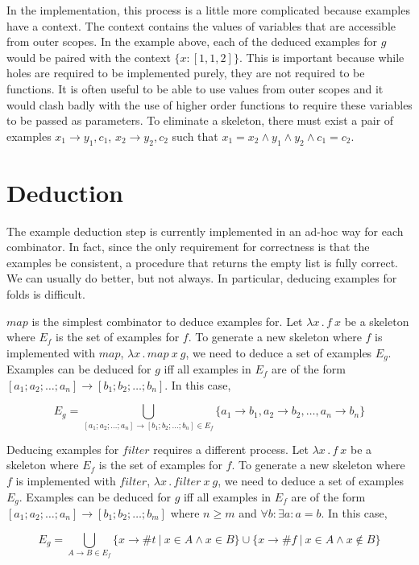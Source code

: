 \documentclass[11pt]{article}
\begin{document}
In the implementation, this process is a little more complicated
because examples have a context. The context contains the values of
variables that are accessible from outer scopes. In the example above,
each of the deduced examples for $g$ would be paired with the context
$\{x:[1,1,2]\}$. This is important because while holes are required to
be implemented purely, they are not required to be functions. It is
often useful to be able to use values from outer scopes and it would
clash badly with the use of higher order functions to require these
variables to be passed as parameters. To eliminate a skeleton, there
must exist a pair of examples $x_1 \rightarrow y_1, c_1$, $x_2
\rightarrow y_2, c_2$ such that $x_1 = x_2 \land y_1 \land y_2 \land
c_1 = c_2$.

\section{Deduction}
\label{sec-3}
The example deduction step is currently implemented in an ad-hoc way
for each combinator. In fact, since the only requirement for
correctness is that the examples be consistent, a procedure that
returns the empty list is fully correct. We can usually do better, but
not always. In particular, deducing examples for folds is difficult.

$map$ is the simplest combinator to deduce examples for. Let $\lambda
x\,.\,f~x$ be a skeleton where $E_f$ is the set of examples for
$f$. To generate a new skeleton where $f$ is implemented with $map$,
$\lambda x\,.\,map~x~g$, we need to deduce a set of examples
$E_g$. Examples can be deduced for $g$ iff all examples in $E_f$ are
of the form $[a_1; a_2; \dots; a_n] \rightarrow [b_1; b_2; \dots;
b_n]$. In this case,

\[E_g = \bigcup_{[a_1; a_2; \dots; a_n] \rightarrow [b_1; b_2; \dots;
  b_n] \in E_f} \{a_1 \rightarrow b_1, a_2 \rightarrow b_2, \dots, a_n
\rightarrow b_n\}\]

Deducing examples for $filter$ requires a different process. Let
$\lambda x\,.\,f~x$ be a skeleton where $E_f$ is the set of examples
for $f$. To generate a new skeleton where $f$ is implemented with
$filter$, $\lambda x\,.\,filter~x~g$, we need to deduce a set of
examples $E_g$. Examples can be deduced for $g$ iff all examples in
$E_f$ are of the form $[a_1; a_2; \dots; a_n] \rightarrow [b_1; b_2;
\dots; b_m]$ where $n \geq m$ and $\forall b : \exists a : a = b$. In
this case,

\[E_g = \bigcup_{A \rightarrow B \in E_f} \{x \rightarrow \#t
~|~x \in A \land x \in B\} \cup \{x \rightarrow \#f ~|~x \in A \land x
\notin B\}\]
\end{document}
